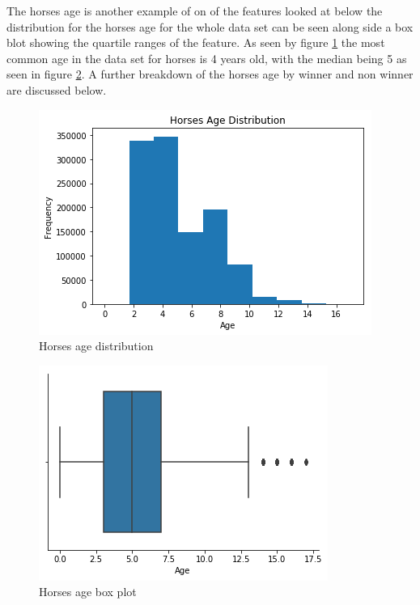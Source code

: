 The horses age is another example of on of the features looked at below the distribution for the horses age for the whole data set can be seen along side a box blot showing the quartile ranges of the feature. As seen by figure \ref{fig:had} the most common age in the data set for horses is 4 years old, with the median being 5 as seen in figure \ref{fig:hab}. A further breakdown of the horses age by winner and non winner are discussed below.
\begin{figure}[H]
  \centering
  \includegraphics[width =(\textwidth)/2]{HorseAgeDistro.png}
  \caption{Horses age distribution}
  \label{fig:had}
\end{figure}
\begin{figure}[H]
  \centering
  \includegraphics[width =(\textwidth)/2]{HorseAgeBoxplot.png}
  \caption{Horses age box plot}
  \label{fig:hab}
\end{figure}

